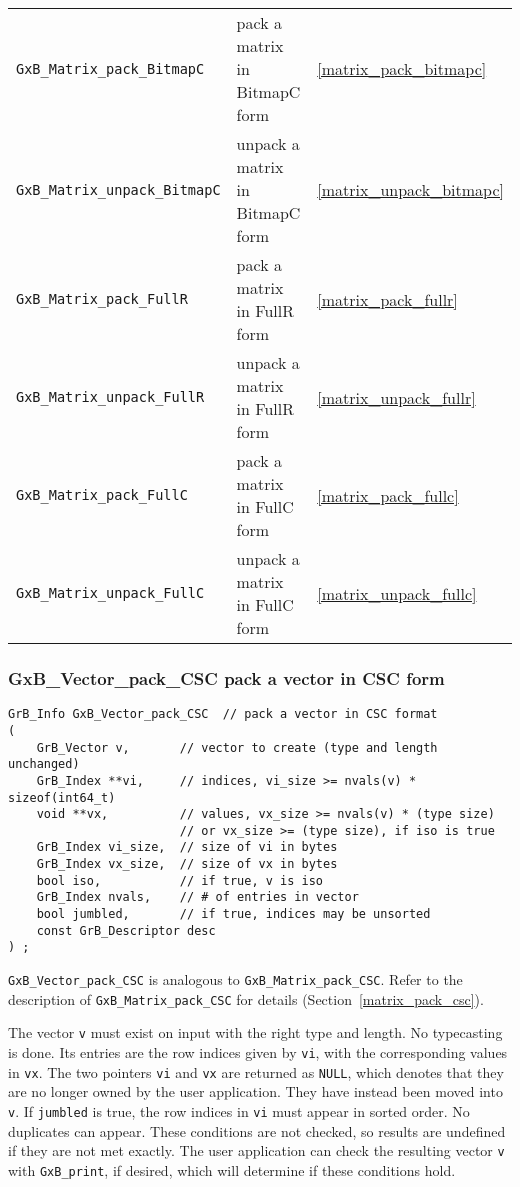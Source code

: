 \documentclass[12pt]{article}
\begin{document}
{\begin{tabular}{lll}
\hline
\verb'GxB_Matrix_pack_BitmapC'    & pack a matrix in BitmapC form & \ref{matrix_pack_bitmapc} \\
\verb'GxB_Matrix_unpack_BitmapC'  & unpack a matrix in BitmapC form & \ref{matrix_unpack_bitmapc} \\
\hline
\verb'GxB_Matrix_pack_FullR'      & pack a matrix in FullR form & \ref{matrix_pack_fullr} \\
\verb'GxB_Matrix_unpack_FullR'    & unpack a matrix in FullR form & \ref{matrix_unpack_fullr} \\
\hline
\verb'GxB_Matrix_pack_FullC'      & pack a matrix in FullC form & \ref{matrix_pack_fullc} \\
\verb'GxB_Matrix_unpack_FullC'    & unpack a matrix in FullC form & \ref{matrix_unpack_fullc} \\
\hline
\end{tabular}
}

\newpage
\subsubsection{{\sf GxB\_Vector\_pack\_CSC} pack a vector in CSC form}
\label{vector_pack_csc}

\begin{mdframed}[userdefinedwidth=6in]
{\footnotesize
\begin{verbatim}
GrB_Info GxB_Vector_pack_CSC  // pack a vector in CSC format
(
    GrB_Vector v,       // vector to create (type and length unchanged)
    GrB_Index **vi,     // indices, vi_size >= nvals(v) * sizeof(int64_t)
    void **vx,          // values, vx_size >= nvals(v) * (type size)
                        // or vx_size >= (type size), if iso is true
    GrB_Index vi_size,  // size of vi in bytes
    GrB_Index vx_size,  // size of vx in bytes
    bool iso,           // if true, v is iso
    GrB_Index nvals,    // # of entries in vector
    bool jumbled,       // if true, indices may be unsorted
    const GrB_Descriptor desc
) ;
\end{verbatim}
} \end{mdframed}

\noindent
\verb'GxB_Vector_pack_CSC' is analogous to \verb'GxB_Matrix_pack_CSC'.
Refer to the description of \verb'GxB_Matrix_pack_CSC' for details
(Section~\ref{matrix_pack_csc}).

The vector \verb'v' must
exist on input with the right type and length.  No typecasting is done.
Its entries are
the row indices given by \verb'vi', with the corresponding values in \verb'vx'.
The two pointers \verb'vi' and \verb'vx' are returned as \verb'NULL', which
denotes that they are no longer owned by the user application.  They have
instead been moved into \verb'v'.  If \verb'jumbled'
is true, the row indices in \verb'vi' must appear in sorted order.  No
duplicates can appear.  These conditions are not checked, so results are
undefined if they are not met exactly.  The user application can check the
resulting vector \verb'v' with \verb'GxB_print', if desired, which will
determine if these conditions hold.
\end{document}
